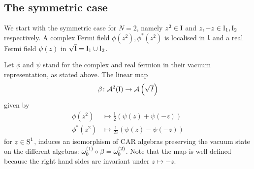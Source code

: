 \subsection{The symmetric case}
\label{beta symmetric}
We start with the symmetric case for $N=2$,
namely $z^2\in\textrm{I}$ and $z,-z\in\textrm{I}_1,\textrm{I}_2$ 
respectively. A complex Fermi field $\phi(z^2),
\phi^*(z^2)$ is localised in $\textrm{I}$ and a real 
Fermi field $\psi(z)$ in $\sqrt{\textrm{I}}=\textrm{I}_1\cup 
\textrm{I}_2$.
\begin{proposition}
Let $\phi$ and $\psi$ stand for the complex and real 
fermion in their vacuum representation, as stated 
above. The linear map 
\begin{equation}
\label{beta}
\beta\colon\mathcal{A}^2(\textrm{I})
\to\mathcal{A}\left(\sqrt{I}\right)
\end{equation}
given by 
\begin{align}
\phi(z^2)&\mapsto\frac{1}{2}
\left(\psi(z)+\psi(-z)\right)
\label{beta_complex}\\[1ex]
\phi^*(z^2)&\mapsto\frac{1}{2z}
\left(\psi(z)-\psi(-z)\right)
\end{align}
for $z\in\textrm{S}^1$, induces an isomorphism of $\textrm{CAR}$
algebras preserving the vacuum state on the different 
algebras: $\omega_0^{(1)}\circ\beta=\omega_0^{(2)}$. Note that 
the map is well defined because the right hand sides
are invariant under $z\mapsto -z$.
\end{proposition}
